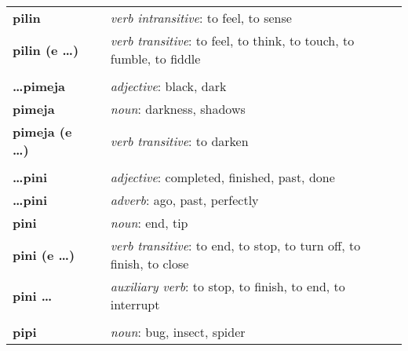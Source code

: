 \begin{supertabular}{p{2,5cm}|ll}
    \textbf{pilin}               &  & \textit{verb intransitive}: to feel, to sense                                                              \\
    \textbf{pilin (e \dots)}     &  & \textit{verb transitive}: to feel, to think, to touch, to fumble, to fiddle                                \\
                                 &  &                                                                                                            \\
    \textbf{\dots pimeja}        &  & \textit{adjective}: black, dark                                                                            \\
    \textbf{pimeja}              &  & \textit{noun}: darkness, shadows                                                                           \\
    \textbf{pimeja (e \dots)}    &  & \textit{verb transitive}: to darken                                                                        \\
                                 &  &                                                                                                            \\
    \textbf{\dots pini}          &  & \textit{adjective}: completed, finished, past, done                                                        \\
    \textbf{\dots pini}          &  & \textit{adverb}: ago, past, perfectly                                                                      \\
    \textbf{pini}                &  & \textit{noun}: end, tip                                                                                    \\
    \textbf{pini (e \dots)}      &  & \textit{verb transitive}: to end, to stop, to turn off, to finish, to close                                \\
    \textbf{pini \dots }         &  & \textit{auxiliary verb}: to stop, to finish, to end, to interrupt                                          \\
                                 &  &                                                                                                            \\
    \textbf{pipi}                &  & \textit{noun}: bug, insect, spider                                                                         \\

\end{supertabular}
